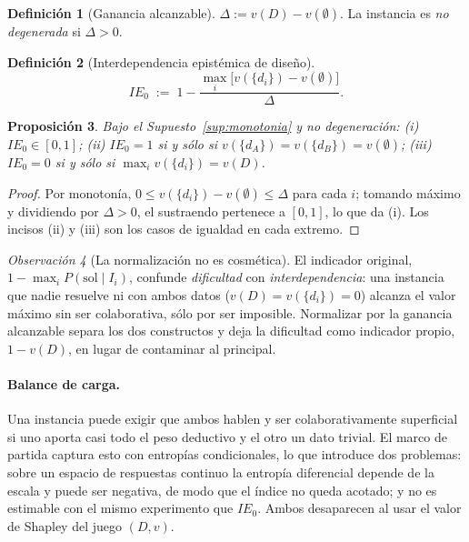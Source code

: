 \documentclass[11pt,a4paper]{article}
\theoremstyle{definition}
\newtheorem{definicion}{Definición}[section]
\theoremstyle{plain}
\newtheorem{proposicion}[definicion]{Proposición}
\theoremstyle{remark}
\newtheorem{observacion}[definicion]{Observación}
\begin{document}
\begin{definicion}[Ganancia alcanzable]
$\Delta:=v(D)-v(\emptyset)$. La instancia es \emph{no degenerada} si $\Delta>0$.
\end{definicion}

\begin{definicion}[Interdependencia epistémica de diseño]\label{def:ie0}
\[
  IE_0\;:=\;1-\frac{\max_{i}\big[v(\{d_i\})-v(\emptyset)\big]}{\Delta}.
\]
\end{definicion}

\begin{proposicion}\label{prop:ie}
Bajo el Supuesto~\ref{sup:monotonia} y no degeneración:
(i) $IE_0\in[0,1]$;
(ii) $IE_0=1$ si y sólo si $v(\{d_A\})=v(\{d_B\})=v(\emptyset)$;
(iii) $IE_0=0$ si y sólo si $\max_i v(\{d_i\})=v(D)$.
\end{proposicion}

\begin{proof}
Por monotonía, $0\le v(\{d_i\})-v(\emptyset)\le\Delta$ para cada $i$; tomando
máximo y dividiendo por $\Delta>0$, el sustraendo pertenece a $[0,1]$, lo que da
(i). Los incisos (ii) y (iii) son los casos de igualdad en cada extremo.
\end{proof}

\begin{observacion}[La normalización no es cosmética]\label{obs:normalizacion}
El indicador original, $1-\max_i P(\text{sol}\mid I_i)$, confunde
\emph{dificultad} con \emph{interdependencia}: una instancia que nadie resuelve ni
con ambos datos ($v(D)=v(\{d_i\})=0$) alcanza el valor máximo sin ser
colaborativa, sólo por ser imposible. Normalizar por la ganancia alcanzable separa
los dos constructos y deja la dificultad como indicador propio, $1-v(D)$, en lugar
de contaminar al principal.
\end{observacion}

\paragraph{Balance de carga.}
Una instancia puede exigir que ambos hablen y ser colaborativamente superficial si
uno aporta casi todo el peso deductivo y el otro un dato trivial. El marco de
partida captura esto con entropías condicionales, lo que introduce dos problemas:
sobre un espacio de respuestas continuo la entropía diferencial depende de la
escala y puede ser negativa, de modo que el índice no queda acotado; y no es
estimable con el mismo experimento que $IE_0$. Ambos desaparecen al usar el valor
de Shapley del juego $(D,v)$.
\end{document}
